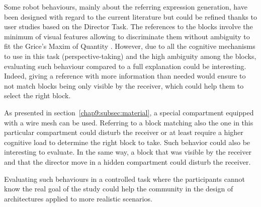 \documentclass[a4paper,11pt,twoside]{StyleThese}
\begin{document}
Some robot behaviours, mainly about the referring expression generation, have been designed with regard to the current literature but could be refined thanks to user studies based on the Director Task. The references to the blocks involve the minimum of visual features allowing to discriminate them without ambiguity to fit the Grice's Maxim of Quantity \cite{grice_1975_logic}. However, due to all the cognitive mechanisms to use in this task (\eg perspective-taking) and the high ambiguity among the blocks, evaluating such behaviour compared to a full explanation could be interesting. Indeed, giving a reference with more information than needed would ensure to not match blocks being only visible by the receiver, which could help them to select the right block.

As presented in section~\ref{chap9:subsec:material}, a special compartment equipped with a wire mesh can be used. Referring to a block matching also the one in this particular compartment could disturb the receiver or at least require a higher cognitive load to determine the right block to take. Such behavior could also be interesting to evaluate. In the same way, a block that was visible by the receiver and that the director move in a hidden compartment could disturb the receiver.

Evaluating such behaviours in a controlled task where the participants cannot know the real goal of the study could help the community in the design of architectures applied to more realistic scenarios.


\ifdefined{}
\else


\end{document}
